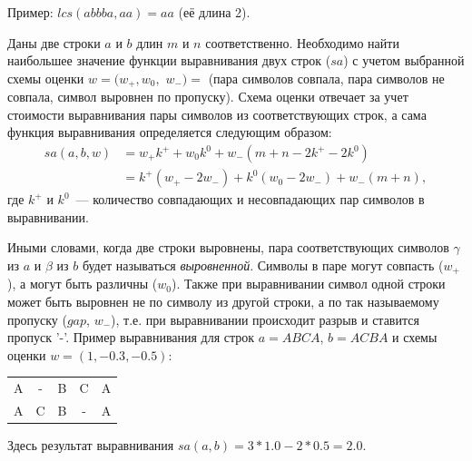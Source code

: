 Пример: \hspace{1cm}
    $lcs(abbba,aa)=aa$ (её длина 2).
 
\begin{definition}
Даны две строки $a$ и $b$ длин $m$ и $n$ соответственно.
Необходимо найти наибольшее  значение функции выравнивания двух строк ($sa$) с учетом выбранной схемы оценки $w = (w_{+}, w_{0} ,$ $w_{-})=$ (пара символов совпала, пара символов не совпала, символ выровнен по пропуску).
Схема оценки отвечает за учет стоимости выравнивания пары символов из соответствующих строк, а сама функция выравнивания определяется следующим образом:
\begin{equation}\label{formula:sa}
\begin{array}{ll}
  sa(a,b,w) &= w_{+}k^{+} + w_{0}k^{0} + w_{-} (m + n - 2k^{+} - 2k^{0}) \\
  &= k^{+} (w_{+} - 2w_{-} ) + k^{0}  (w_{0} - 2w_{-}) + w_{-}(m + n),
\end{array}
\end{equation}
где $k^{+}$ и $k^{0}$~--- количество совпадающих и несовпадающих пар символов в выравнивании.
\end{definition}

Иными словами, когда две строки выровнены, пара соответствующих символов $\gamma$ из $a$ и $\beta$ из $b$ будет называться \emph{выровненной}.
Символы в паре могут совпасть ($w_{+}$), а могут быть различны ($w_{0}$).
Также при выравнивании символ одной строки может  быть выровнен не по символу из другой строки, а по так называемому пропуску ($gap$, $w_{-}$), т.е. при выравнивании происходит разрыв и ставится пропуск '-'.
Пример выравнивания для строк $a=ABCA$, $b=ACBA$ и схемы оценки $w = (1, -0.3, -0.5)$:
\begin{center}
    \begin{tabular}{ccccc}
    A & - & B &  C  &  A \\
    A & C & B &  - &  A
    \end{tabular}
\end{center}
Здесь результат выравнивания $sa(a,b) = 3*1.0-2*0.5 = 2.0$.

